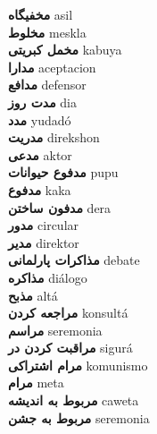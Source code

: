 \textbf{ مخفیگاه  } asil \\
\textbf{ مخلوط  } meskla \\
\textbf{ مخمل کبریتی  } kabuya \\
\textbf{ مدارا  } aceptacion \\
\textbf{ مدافع  } defensor \\
\textbf{ مدت روز  } dia \\
\textbf{ مدد  } yudadó \\
\textbf{ مدریت  } direkshon \\
\textbf{ مدعی  } aktor \\
\textbf{ مدفوع حیوانات  } pupu \\
\textbf{ مدفوع  } kaka \\
\textbf{ مدفون ساختن  } dera \\
\textbf{ مدور  } circular \\
\textbf{ مدیر  } direktor \\
\textbf{ مذاکرات پارلمانی  } debate \\
\textbf{ مذاکره  } diálogo \\
\textbf{ مذبح  } altá \\
\textbf{ مراجعه کردن  } konsultá \\
\textbf{ مراسم  } seremonia \\
\textbf{ مراقبت کردن در  } sigurá \\
\textbf{ مرام اشتراکی  } komunismo \\
\textbf{ مرام  } meta \\
\textbf{ مربوط به اندیشه  } caweta \\
\textbf{ مربوط به جشن  } seremonia \\
